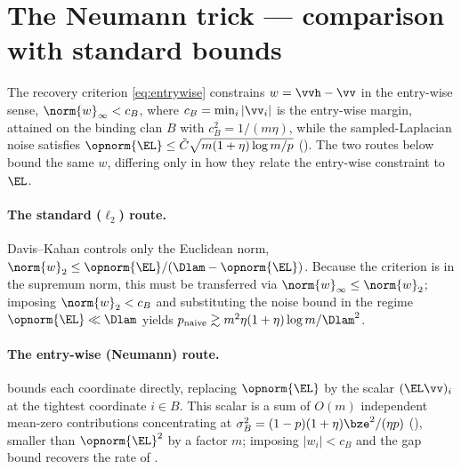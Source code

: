 %
\section{The Neumann trick --- comparison with standard bounds}\label{app:compare}

The recovery criterion \eqref{eq:entrywise} constrains $w=\vvh-\vv$ in the
entry-wise sense, $\norm{w}_\infty<c_B$, where $c_B=\min_i|\vv_i|$ is the
entry-wise margin, attained on the binding clan $B$ with $c_B^2=1/(m\eta)$, while
the sampled-Laplacian noise satisfies $\opnorm{\EL}\le\tilde C\sqrt{m(1+\eta)\log
m/p}$ (). The two routes below bound the same $w$, differing
only in how they relate the entry-wise constraint to $\EL$.

\paragraph{The standard ($\ell_2$) route.} Davis--Kahan controls only the Euclidean
norm, $\norm{w}_2\le\opnorm{\EL}/(\Dlam-\opnorm{\EL})$. Because the criterion is in
the supremum norm, this must be transferred via $\norm{w}_\infty\le\norm{w}_2$;
imposing $\norm{w}_2<c_B$ and substituting the noise bound in the regime
$\opnorm{\EL}\ll\Dlam$ yields $p_{\mathrm{naive}}\gtrsim m^2\eta(1+\eta)\log m/\Dlam^2$.

\paragraph{The entry-wise (Neumann) route.}  bounds each
coordinate directly, replacing $\opnorm{\EL}$ by the scalar $(\EL\vv)_i$ at the
tightest coordinate $i\in B$. This scalar is a sum of $O(m)$ independent mean-zero
contributions concentrating at $\sigma_B^2=(1-p)(1+\eta)\bze^2/(\eta p)$
(), smaller than $\opnorm{\EL}^2$ by a factor $m$; imposing
$|w_i|<c_B$ and the gap bound recovers the rate of .

